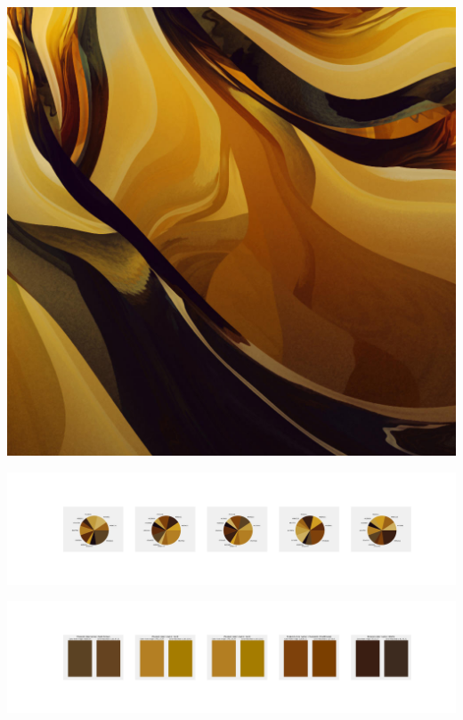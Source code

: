 \documentclass[11pt]{article}
\begin{document}
\begin{landscape}
    \begin{center}
    \includegraphics[width=\textwidth]{./nbimg/file (424).jpg}
    \end{center}

    \begin{center}
    \includegraphics[width=250mm]{./nbimg/pie-361.jpg}
    \end{center}

    \begin{center}
    \includegraphics[width=250mm]{./nbimg/peak-361.jpg}
    \end{center}
    


\end{landscape}
\end{document}
